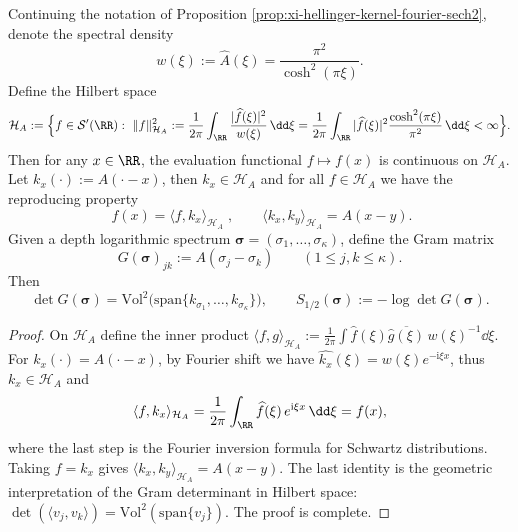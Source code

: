 \begin{proposition}\label{prop:xi-hellinger-kernel-rkhs-volume}
Continuing the notation of Proposition \ref{prop:xi-hellinger-kernel-fourier-sech2}, denote the spectral density
\[
w(\xi):=\widehat A(\xi)=\frac{\pi^2}{\cosh^2(\pi\xi)}.
\]
Define the Hilbert space
\[
\mathcal H_{A}
:=\Bigl\{f\in\mathcal S'(\RR):\ \|f\|_{\mathcal H_A}^{2}
:=\frac{1}{2\pi}\int_{\RR}\frac{|\widehat f(\xi)|^{2}}{w(\xi)}\,\dd\xi
=\frac{1}{2\pi}\int_{\RR}|\widehat f(\xi)|^{2}\frac{\cosh^{2}(\pi\xi)}{\pi^{2}}\,\dd\xi<\infty\Bigr\}.
\]
Then for any \(x\in\RR\), the evaluation functional \(f\mapsto f(x)\) is continuous on \(\mathcal H_A\).
Let \(k_x(\cdot):=A(\cdot-x)\), then \(k_x\in\mathcal H_A\) and for all \(f\in\mathcal H_A\) we have the reproducing property
\[
\boxed{\;f(x)=\langle f,k_x\rangle_{\mathcal H_A}\;},
\qquad
\langle k_x,k_y\rangle_{\mathcal H_A}=A(x-y).
\]
Given a depth logarithmic spectrum \(\boldsymbol{\sigma}=(\sigma_1,\dots,\sigma_\kappa)\), define the Gram matrix
\[
G(\boldsymbol{\sigma})_{jk}:=A(\sigma_j-\sigma_k)\qquad(1\le j,k\le\kappa).
\]
Then
\[
\boxed{\;
\det G(\boldsymbol{\sigma})
=\mathrm{Vol}^{2}\bigl(\mathrm{span}\{k_{\sigma_1},\dots,k_{\sigma_\kappa}\}\bigr),\qquad
S_{1/2}(\boldsymbol{\sigma}):=-\log\det G(\boldsymbol{\sigma}).\;}
\]
\end{proposition}
\begin{proof}
On \(\mathcal H_A\) define the inner product
\(
\langle f,g\rangle_{\mathcal H_A}:=\frac{1}{2\pi}\int \widehat f(\xi)\overline{\widehat g(\xi)}\,w(\xi)^{-1}\dd\xi
\).
For \(k_x(\cdot)=A(\cdot-x)\), by Fourier shift we have \(\widehat{k_x}(\xi)=w(\xi)e^{-\mathrm{i}\xi x}\), thus \(k_x\in\mathcal H_A\) and
\[
\langle f,k_x\rangle_{\mathcal H_A}
=\frac{1}{2\pi}\int_{\RR}\widehat f(\xi)\,e^{\mathrm{i}\xi x}\,\dd\xi
=f(x),
\]
where the last step is the Fourier inversion formula for Schwartz distributions.
Taking \(f=k_x\) gives \(\langle k_x,k_y\rangle_{\mathcal H_A}=A(x-y)\).
The last identity is the geometric interpretation of the Gram determinant in Hilbert space: \(\det(\langle v_j,v_k\rangle)=\mathrm{Vol}^{2}(\mathrm{span}\{v_j\})\). The proof is complete.
\end{proof}

